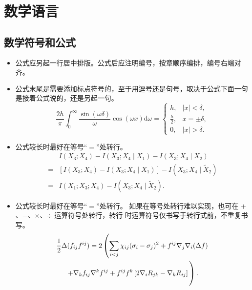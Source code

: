 
\chapter{数学语言}

\section{数学符号和公式}

\begin{itemize}
    \item 公式应另起一行居中排版。公式后应注明编号，按章顺序编排，编号右端对齐。
    \item 公式末尾是需要添加标点符号的，至于用逗号还是句号，取决于公式下面一句是接着公式说的，还是另起一句。
    \begin{equation}
  \frac{2h}{\pi}\int_{0}^{\infty}\frac{\sin\left( \omega\delta \right)}{\omega}
  \cos\left( \omega x \right) \mathrm{d}\omega = 
  \begin{cases}
    h, & \left| x \right| < \delta, \\
    \frac{h}{2}, & x = \pm \delta, \\
    0, & \left| x \right| > \delta.
  \end{cases}
\end{equation}
    \item 公式较长时最好在等号“$=$”处转行。
    \begin{align}
    & I (X_3; X_4) - I (X_3; X_4 \mid X_1) - I (X_3; X_4 \mid X_2) \nonumber \\
  = & [I (X_3; X_4) - I (X_3; X_4 \mid X_1)] - I (X_3; X_4 \mid \tilde{X}_2) \\
  = & I (X_1; X_3; X_4) - I (X_3; X_4 \mid \tilde{X}_2).
\end{align}
\item 公式较长时最好在等号“$=$”处转行。
如果在等号处转行难以实现，也可在 $+$、$-$、$\times$、$\div$ 运算符号处转行，转行
时运算符号仅书写于转行式前，不重复书写。
\begin{multline}
  \frac{1}{2} \Delta (f_{ij} f^{ij}) =
    2 \left(\sum_{i<j} \chi_{ij}(\sigma_{i} - \sigma_{j})^{2}
    + f^{ij} \nabla_{j} \nabla_{i} (\Delta f) \right. \\
  \left. + \nabla_{k} f_{ij} \nabla^{k} f^{ij} +
    f^{ij} f^{k} \left[2\nabla_{i}R_{jk}
    - \nabla_{k} R_{ij} \right] \vphantom{\sum_{i<j}} \right).
\end{multline}
\end{itemize}




